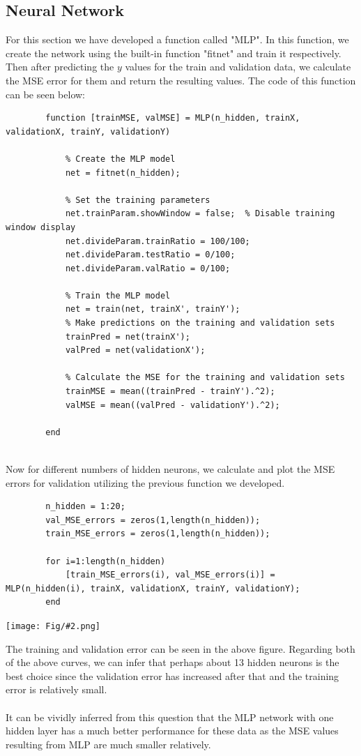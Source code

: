 \documentclass[]{article}
\newcommand{\pict}[2]{\begin{center}
		\texttt{[image: Fig/\#2.png]}
\end{center}}
\begin{document}
	\subsection{Neural Network}
	For this section we have developed a function called "MLP". In this function, we create the network using the built-in function "fitnet" and train it respectively. Then after predicting the $y$ values for the train and validation data, we calculate the MSE error for them and return the resulting values. The code of this function can be seen below:
	\begin{lstlisting}
		function [trainMSE, valMSE] = MLP(n_hidden, trainX, validationX, trainY, validationY)
		
			% Create the MLP model
			net = fitnet(n_hidden);
			
			% Set the training parameters
			net.trainParam.showWindow = false;  % Disable training window display
			net.divideParam.trainRatio = 100/100;
			net.divideParam.testRatio = 0/100;
			net.divideParam.valRatio = 0/100;
			
			% Train the MLP model
			net = train(net, trainX', trainY');
			% Make predictions on the training and validation sets
			trainPred = net(trainX');
			valPred = net(validationX');
			
			% Calculate the MSE for the training and validation sets
			trainMSE = mean((trainPred - trainY').^2);
			valMSE = mean((valPred - validationY').^2);
			
		end
		
	\end{lstlisting}
	Now for different numbers of hidden neurons, we calculate and plot the MSE errors for validation utilizing the previous function we developed.
	\begin{lstlisting}
		n_hidden = 1:20;
		val_MSE_errors = zeros(1,length(n_hidden));
		train_MSE_errors = zeros(1,length(n_hidden));
		
		for i=1:length(n_hidden)
			[train_MSE_errors(i), val_MSE_errors(i)] = MLP(n_hidden(i), trainX, validationX, trainY, validationY);
		end
	\end{lstlisting}
	\pict{0.45}{F6}
	The training and validation error can be seen in the above figure. Regarding both of the above curves, we can infer that perhaps about 13 hidden neurons is the best choice since the validation error has increased after that and the training error is relatively small.\\\\
	It can be vividly inferred from this question that the MLP network with one hidden layer has a much better performance for these data as the MSE values resulting from MLP are much smaller relatively.\\\\
\end{document}
